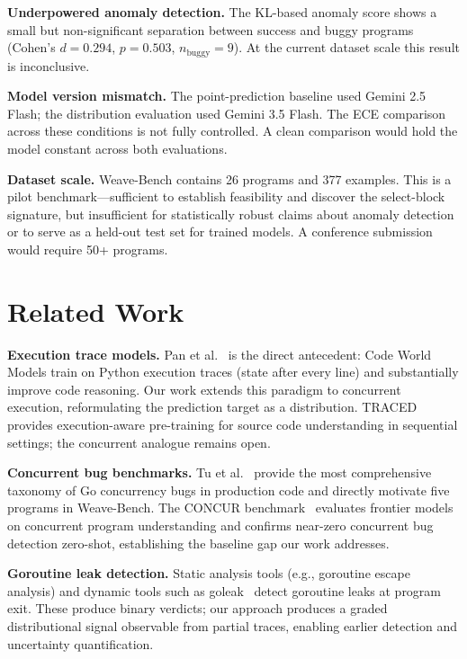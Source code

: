 \documentclass[sigconf,review,anonymous]{acmart}
\begin{document}
\textbf{Underpowered anomaly detection.} The KL-based anomaly score shows a
small but non-significant separation between success and buggy programs (Cohen's
$d{=}0.294$, $p{=}0.503$, $n_{\mathrm{buggy}}{=}9$). At the current dataset
scale this result is inconclusive.

\textbf{Model version mismatch.} The point-prediction baseline used Gemini 2.5
Flash; the distribution evaluation used Gemini 3.5 Flash. The ECE comparison
across these conditions is not fully controlled. A clean comparison would hold
the model constant across both evaluations.

\textbf{Dataset scale.} Weave-Bench contains 26 programs and 377 examples. This
is a pilot benchmark---sufficient to establish feasibility and discover the
select-block signature, but insufficient for statistically robust claims about
anomaly detection or to serve as a held-out test set for trained models. A
conference submission would require 50+ programs.

\section{Related Work}

\textbf{Execution trace models.} Pan et al.~\cite{meta2025cwm} is the direct
antecedent: Code World Models train on Python execution traces (state after every
line) and substantially improve code reasoning. Our work extends this paradigm to
concurrent execution, reformulating the prediction target as a distribution.
TRACED~\cite{traced2024} provides execution-aware pre-training for source code
understanding in sequential settings; the concurrent analogue remains open.

\textbf{Concurrent bug benchmarks.} Tu et al.~\cite{tu2019understanding} provide
the most comprehensive taxonomy of Go concurrency bugs in production code and
directly motivate five programs in Weave-Bench. The CONCUR
benchmark~\cite{concur2026} evaluates frontier models on concurrent program
understanding and confirms near-zero concurrent bug detection zero-shot,
establishing the baseline gap our work addresses.

\textbf{Goroutine leak detection.} Static analysis tools (e.g., goroutine escape
analysis) and dynamic tools such as goleak~\cite{goleak2019} detect goroutine
leaks at program exit. These produce binary verdicts; our approach produces a
graded distributional signal observable from partial traces, enabling earlier
detection and uncertainty quantification.
\end{document}
